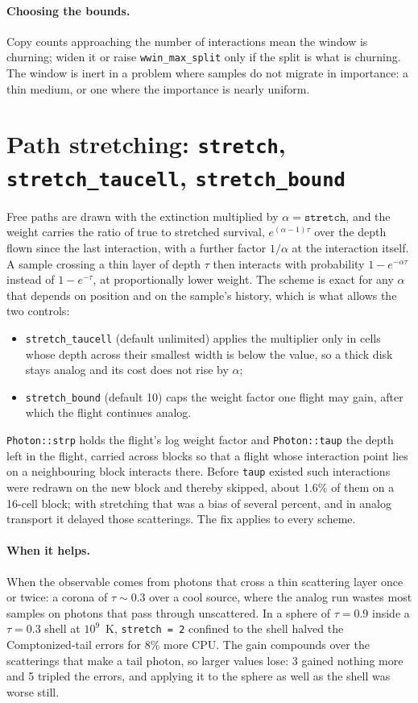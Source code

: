 \documentclass[11pt]{article}
\newcommand{\key}[1]{\texttt{#1}}
\begin{document}
\paragraph{Choosing the bounds.} Copy counts approaching the number of interactions
mean the window is churning; widen it or raise \key{wwin\_max\_split} only if the split
is what is churning. The window is inert in a problem where samples do not migrate in
importance: a thin medium, or one where the importance is nearly uniform.

\section{Path stretching: \key{stretch}, \key{stretch\_taucell}, \key{stretch\_bound}}

Free paths are drawn with the extinction multiplied by $\alpha = \key{stretch}$, and the
weight carries the ratio of true to stretched survival, $e^{(\alpha-1)\tau}$ over the
depth flown since the last interaction, with a further factor $1/\alpha$ at the
interaction itself. A sample crossing a thin layer of depth $\tau$ then interacts with
probability $1 - e^{-\alpha\tau}$ instead of $1 - e^{-\tau}$, at proportionally lower
weight. The scheme is exact for any $\alpha$ that depends on position and on the
sample's history, which is what allows the two controls:
\begin{itemize}
\item \key{stretch\_taucell} (default unlimited) applies the multiplier only in cells
  whose depth across their smallest width is below the value, so a thick disk stays
  analog and its cost does not rise by $\alpha$;
\item \key{stretch\_bound} (default 10) caps the weight factor one flight may gain,
  after which the flight continues analog.
\end{itemize}
\key{Photon::strp} holds the flight's log weight factor and \key{Photon::taup} the depth
left in the flight, carried across blocks so that a flight whose interaction point lies
on a neighbouring block interacts there. Before \key{taup} existed such interactions were
redrawn on the new block and thereby skipped, about 1.6\% of them on a 16-cell block; with
stretching that was a bias of several percent, and in analog transport it delayed those
scatterings. The fix applies to every scheme.

\paragraph{When it helps.} When the observable comes from photons that cross a thin
scattering layer once or twice: a corona of $\tau \sim 0.3$ over a cool source, where
the analog run wastes most samples on photons that pass through unscattered. In a sphere
of $\tau = 0.9$ inside a $\tau = 0.3$ shell at $10^9$~K, \key{stretch = 2} confined to
the shell halved the Comptonized-tail errors for 8\% more CPU. The gain compounds over
the scatterings that make a tail photon, so larger values lose: 3 gained nothing more and
5 tripled the errors, and applying it to the sphere as well as the shell was worse still.
\end{document}

